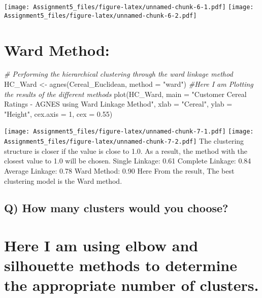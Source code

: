 \documentclass[
]{article}
\newenvironment{Shaded}{\begin{snugshade}}{\end{snugshade}}
\newcommand{\AttributeTok}[1]{\textcolor[rgb]{0.77,0.63,0.00}{#1}}
\newcommand{\CommentTok}[1]{\textcolor[rgb]{0.56,0.35,0.01}{\textit{#1}}}
\newcommand{\DecValTok}[1]{\textcolor[rgb]{0.00,0.00,0.81}{#1}}
\newcommand{\FloatTok}[1]{\textcolor[rgb]{0.00,0.00,0.81}{#1}}
\newcommand{\FunctionTok}[1]{\textcolor[rgb]{0.00,0.00,0.00}{#1}}
\newcommand{\NormalTok}[1]{#1}
\newcommand{\OtherTok}[1]{\textcolor[rgb]{0.56,0.35,0.01}{#1}}
\newcommand{\StringTok}[1]{\textcolor[rgb]{0.31,0.60,0.02}{#1}}
\begin{document}
\texttt{[image: Assignment5\_files/figure-latex/unnamed-chunk-6-1.pdf]}
\texttt{[image: Assignment5\_files/figure-latex/unnamed-chunk-6-2.pdf]}

\hypertarget{ward-method}{%
\section{Ward Method:}\label{ward-method}}

\begin{Shaded}
\begin{Highlighting}[]
\CommentTok{\# Performing the hierarchical clustering through the ward linkage method}
\NormalTok{HC\_Ward }\OtherTok{\textless{}{-}} \FunctionTok{agnes}\NormalTok{(Cereal\_Euclidean, }\AttributeTok{method =} \StringTok{"ward"}\NormalTok{)}
\CommentTok{\#Here I am  Plotting the results of the different methods}
\FunctionTok{plot}\NormalTok{(HC\_Ward, }
     \AttributeTok{main =} \StringTok{"Customer Cereal Ratings {-} AGNES using Ward Linkage Method"}\NormalTok{,}
     \AttributeTok{xlab =} \StringTok{"Cereal"}\NormalTok{,}
     \AttributeTok{ylab =} \StringTok{"Height"}\NormalTok{,}
     \AttributeTok{cex.axis =} \DecValTok{1}\NormalTok{,}
     \AttributeTok{cex =} \FloatTok{0.55}\NormalTok{)}
\end{Highlighting}
\end{Shaded}

\texttt{[image: Assignment5\_files/figure-latex/unnamed-chunk-7-1.pdf]}
\texttt{[image: Assignment5\_files/figure-latex/unnamed-chunk-7-2.pdf]}
The clustering structure is closer if the value is close to 1.0. As a
result, the method with the closest value to 1.0 will be chosen. Single
Linkage: 0.61 Complete Linkage: 0.84 Average Linkage: 0.78 Ward Method:
0.90 Here From the result, The best clustering model is the Ward method.

\hypertarget{q-how-many-clusters-would-you-choose}{%
\subsection{Q) How many clusters would you
choose?}\label{q-how-many-clusters-would-you-choose}}

\hypertarget{here-i-am-using-elbow-and-silhouette-methods-to-determine-the-appropriate-number-of-clusters.}{%
\section{Here I am using elbow and silhouette methods to determine the
appropriate number of
clusters.}\label{here-i-am-using-elbow-and-silhouette-methods-to-determine-the-appropriate-number-of-clusters.}}
\end{document}
